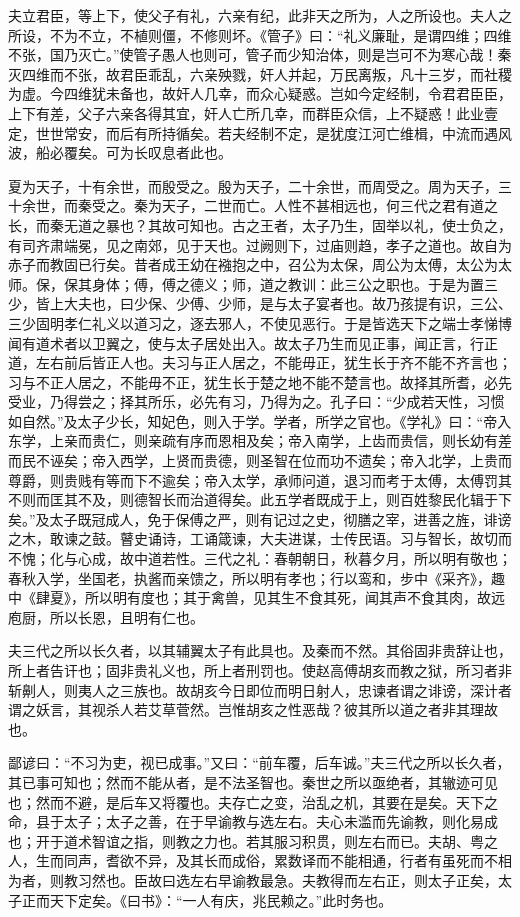 \documentclass[]{article}
\begin{document}
夫立君臣，等上下，使父子有礼，六亲有纪，此非天之所为，人之所设也。夫人之所设，不为不立，不植则僵，不修则坏。《管子》曰：``礼义廉耻，是谓四维；四维不张，国乃灭亡。''使管子愚人也则可，管子而少知治体，则是岂可不为寒心哉！秦灭四维而不张，故君臣乖乱，六亲殃戮，奸人并起，万民离叛，凡十三岁，而社稷为虚。今四维犹未备也，故奸人几幸，而众心疑惑。岂如今定经制，令君君臣臣，上下有差，父子六亲各得其宜，奸人亡所几幸，而群臣众信，上不疑惑！此业壹定，世世常安，而后有所持循矣。若夫经制不定，是犹度江河亡维楫，中流而遇风波，船必覆矣。可为长叹息者此也。

夏为天子，十有余世，而殷受之。殷为天子，二十余世，而周受之。周为天子，三十余世，而秦受之。秦为天子，二世而亡。人性不甚相远也，何三代之君有道之长，而秦无道之暴也？其故可知也。古之王者，太子乃生，固举以礼，使士负之，有司齐肃端冕，见之南郊，见于天也。过阙则下，过庙则趋，孝子之道也。故自为赤子而教固已行矣。昔者成王幼在襁抱之中，召公为太保，周公为太傅，太公为太师。保，保其身体；傅，傅之德义；师，道之教训：此三公之职也。于是为置三少，皆上大夫也，曰少保、少傅、少师，是与太子宴者也。故乃孩提有识，三公、三少固明孝仁礼义以道习之，逐去邪人，不使见恶行。于是皆选天下之端士孝悌博闻有道术者以卫翼之，使与太子居处出入。故太子乃生而见正事，闻正言，行正道，左右前后皆正人也。夫习与正人居之，不能毋正，犹生长于齐不能不齐言也；习与不正人居之，不能毋不正，犹生长于楚之地不能不楚言也。故择其所耆，必先受业，乃得尝之；择其所乐，必先有习，乃得为之。孔子曰：``少成若天性，习惯如自然。''及太子少长，知妃色，则入于学。学者，所学之官也。《学礼》曰：``帝入东学，上亲而贵仁，则亲疏有序而恩相及矣；帝入南学，上齿而贵信，则长幼有差而民不诬矣；帝入西学，上贤而贵德，则圣智在位而功不遗矣；帝入北学，上贵而尊爵，则贵贱有等而下不逾矣；帝入太学，承师问道，退习而考于太傅，太傅罚其不则而匡其不及，则德智长而治道得矣。此五学者既成于上，则百姓黎民化辑于下矣。''及太子既冠成人，免于保傅之严，则有记过之史，彻膳之宰，进善之旌，诽谤之木，敢谏之鼓。瞽史诵诗，工诵箴谏，大夫进谋，士传民语。习与智长，故切而不愧；化与心成，故中道若性。三代之礼：春朝朝日，秋暮夕月，所以明有敬也；春秋入学，坐国老，执酱而亲馈之，所以明有孝也；行以鸾和，步中《采齐》，趣中《肆夏》，所以明有度也；其于禽兽，见其生不食其死，闻其声不食其肉，故远庖厨，所以长恩，且明有仁也。

夫三代之所以长久者，以其辅翼太子有此具也。及秦而不然。其俗固非贵辞让也，所上者告讦也；固非贵礼义也，所上者刑罚也。使赵高傅胡亥而教之狱，所习者非斩劓人，则夷人之三族也。故胡亥今日即位而明日射人，忠谏者谓之诽谤，深计者谓之妖言，其视杀人若艾草菅然。岂惟胡亥之性恶哉？彼其所以道之者非其理故也。

鄙谚曰：``不习为吏，视已成事。''又曰：``前车覆，后车诚。''夫三代之所以长久者，其已事可知也；然而不能从者，是不法圣智也。秦世之所以亟绝者，其辙迹可见也；然而不避，是后车又将覆也。夫存亡之变，治乱之机，其要在是矣。天下之命，县于太子；太子之善，在于早谕教与选左右。夫心未滥而先谕教，则化易成也；开于道术智谊之指，则教之力也。若其服习积贯，则左右而已。夫胡、粤之人，生而同声，耆欲不异，及其长而成俗，累数译而不能相通，行者有虽死而不相为者，则教习然也。臣故曰选左右早谕教最急。夫教得而左右正，则太子正矣，太子正而天下定矣。《曰书》：``一人有庆，兆民赖之。''此时务也。
\end{document}
